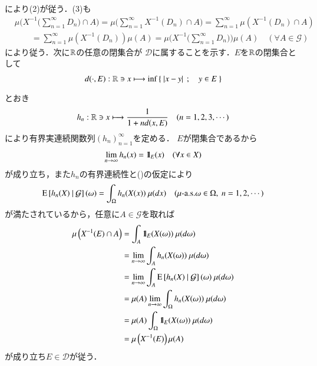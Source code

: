 \begin{prf}
\begin{description}
				により(2)が従う．(3)も
				\begin{align}
					&\mu\Biggl( X^{-1}\biggl( \sum_{n=1}^{\infty} D_n \biggr) \cap A \Biggr) 
					= \mu\Biggl( \sum_{n=1}^{\infty} X^{-1}(D_n) \cap A \Biggr) 
					= \sum_{n=1}^{\infty} \mu\left( X^{-1}(D_n) \cap A \right) \\
					&\qquad = \sum_{n=1}^{\infty} \mu\left( X^{-1}(D_n) \right) \mu(A) 
					= \mu\Biggl( X^{-1}\biggl( \sum_{n=1}^{\infty} D_n \biggr) \Biggr) \mu(A)\quad (\forall A \in \mathcal{G})
				\end{align}
				により従う．次に$\mathbb{R}$の任意の閉集合が
				$\mathscr{D}$に属することを示す．$E$を$\mathbb{R}$の閉集合として
				\begin{align}
					d(\cdot,E):\mathbb{R} \ni x \longmapsto \operatorname*{inf}_{} \left\{\ |x-y|\ \, ; \quad y \in E\ \right\}
				\end{align}
				とおき
				\begin{align}
					h_n:\mathbb{R} \ni x \longmapsto \frac{1}{1 + nd(x,E)} \quad (n=1,2,3,\cdots)
				\end{align}
				により有界実連続関数列$(h_n)_{n=1}^{\infty}$を定める．
				$E$が閉集合であるから
				\begin{align}
					\lim_{n \to \infty} h_n(x) = \mbox{1}\hspace{-0.25em}\mbox{l}_E(x)
					\quad (\forall x \in X)
				\end{align}
				が成り立ち，また$h_n$の有界連続性と()の仮定により
				\begin{align}
					\cexp{h_n(X)}{\mathcal{G}}(\omega) = \int_\Omega h_n(X(x))\ \mu(dx)
					\quad (\mbox{$\mu$-a.s.}\omega \in \Omega,\ n=1,2,\cdots)
				\end{align}
				が満たされているから，任意に$A \in \mathcal{G}$を取れば
				\begin{align}
					\mu\left( X^{-1}(E) \cap A \right) 
					&= \int_A \defunc_E(X(\omega))\ \mu(d\omega) \\
					&= \lim_{n \to \infty} \int_A h_n(X(\omega))\ \mu(d\omega) \\
					&= \lim_{n \to \infty} \int_A \cexp{h_n(X)}{\mathcal{G}}(\omega)\ \mu(d\omega) \\
					&= \mu(A)  \lim_{n \to \infty} \int_{\Omega} h_n(X(\omega))\ \mu(d\omega) \\
					&= \mu(A) \int_{\Omega} \defunc_E(X(\omega))\ \mu(d\omega) \\
					&= \mu\left( X^{-1}(E) \right) \mu(A)
				\end{align}
				が成り立ち$E \in \mathscr{D}$が従う．
			

\end{description}
\end{prf}
